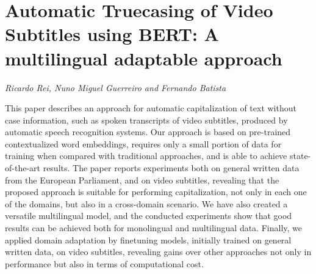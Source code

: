 \documentclass[../booklet.tex]{subfiles}
\begin{document}
\section[Automatic Truecasing of Video Subtitles using BERT: A multilingual adaptable approach. {\it Ricardo Rei, Nuno Miguel Guerreiro and Fernando Batista}]{Automatic Truecasing of Video Subtitles using BERT: A multilingual adaptable approach}
  

\begin{center}
  {\it Ricardo Rei, Nuno Miguel Guerreiro and Fernando Batista}
\end{center}

\vskip 0.8cm

 
This paper describes an approach for automatic capitalization of text without case information, such as spoken transcripts of video subtitles, produced by automatic speech recognition systems. Our approach is based on pre-trained contextualized word embeddings, requires only a small portion of data for training when compared with traditional approaches, and is able to achieve state-of-the-art results. The paper reports experiments both on general written data from the European Parliament, and on video subtitles, revealing that the proposed approach is suitable for performing capitalization, not only in each one of the domains, but also in a cross-domain scenario. We have also created a versatile multilingual model, and the conducted experiments show that good results can be achieved both for monolingual and multilingual data. Finally, we applied domain adaptation by finetuning models, initially trained on general written data, on video subtitles, revealing gains over other approaches not only in performance but also in terms of computational cost.

\end{document}
